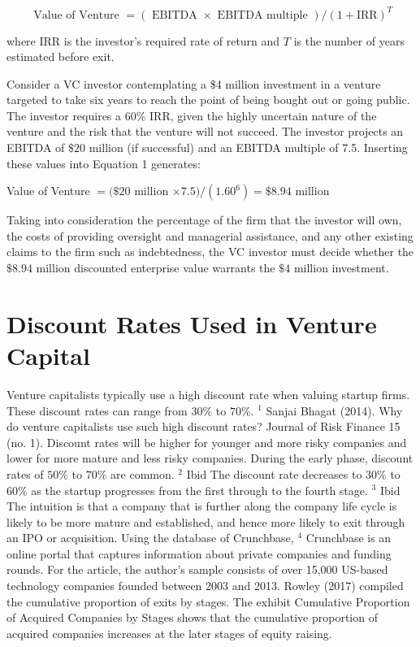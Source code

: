 \documentclass[11pt]{article}
\begin{document}
\begin{equation*}
\text { Value of Venture }=(\text { EBITDA } \times \text { EBITDA multiple }) /(1+\mathrm{IRR})^{T} \tag{1}
\end{equation*}


where IRR is the investor's required rate of return and $T$ is the number of years estimated before exit.

Consider a VC investor contemplating a \$4 million investment in a venture targeted to take six years to reach the point of being bought out or going public. The investor requires a 60\% IRR, given the highly uncertain nature of the venture and the risk that the venture will not succeed. The investor projects an EBITDA of $\$ 20$ million (if successful) and an EBITDA multiple of 7.5. Inserting these values into Equation 1 generates:

Value of Venture $=(\$ 20$ million $\times 7.5) /\left(1.60^{6}\right)=\$ 8.94$ million

Taking into consideration the percentage of the firm that the investor will own, the costs of providing oversight and managerial assistance, and any other existing claims to the firm such as indebtedness, the VC investor must decide whether the $\$ 8.94$ million discounted enterprise value warrants the $\$ 4$ million investment.

\section*{Discount Rates Used in Venture Capital}
Venture capitalists typically use a high discount rate when valuing startup firms. These discount rates can range from $30 \%$ to $70 \%$. ${ }^{1}$ Sanjai Bhagat (2014). Why do venture capitalists use such high discount rates? Journal of Risk Finance 15 (no. 1). Discount rates will be higher for younger and more risky companies and lower for more mature and less risky companies. During the early phase, discount rates of $50 \%$ to $70 \%$ are common. ${ }^{2}$ Ibid The discount rate decreases to $30 \%$ to $60 \%$ as the startup progresses from the first through to the fourth stage. ${ }^{3}$ Ibid The intuition is that a company that is further along the company life cycle is likely to be more mature and established, and hence more likely to exit through an IPO or acquisition. Using the database of Crunchbase, ${ }^{4}$ Crunchbase is an online portal that captures information about private companies and funding rounds. For the article, the author's sample consists of over 15,000 US-based technology companies founded between 2003 and 2013. Rowley (2017) compiled the cumulative proportion of exits by stages. The exhibit Cumulative Proportion of Acquired Companies by Stages shows that the cumulative proportion of acquired companies increases at the later stages of equity raising.
\end{document}
